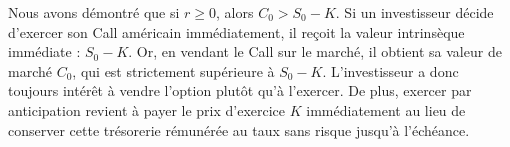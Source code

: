 \begin{intuitionbox}
Nous avons démontré que si $r \ge 0$, alors $C_0 > S_0 - K$. 
Si un investisseur décide d'exercer son Call américain immédiatement, il reçoit la valeur intrinsèque immédiate : $S_0 - K$.
Or, en vendant le Call sur le marché, il obtient sa valeur de marché $C_0$, qui est strictement supérieure à $S_0 - K$. L'investisseur a donc toujours intérêt à vendre l'option plutôt qu'à l'exercer. De plus, exercer par anticipation revient à payer le prix d'exercice $K$ immédiatement au lieu de conserver cette trésorerie rémunérée au taux sans risque jusqu'à l'échéance.
\end{intuitionbox}